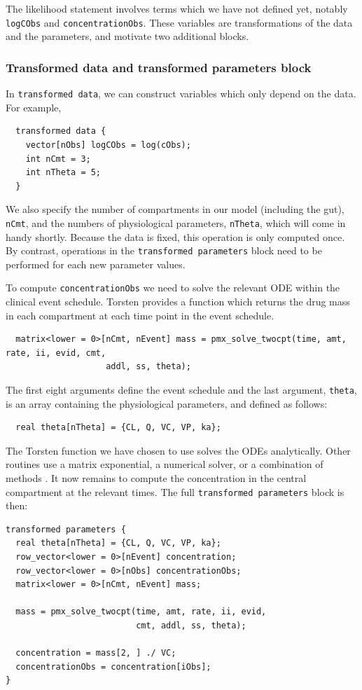 The likelihood statement involves terms which we have not defined yet, notably \texttt{logCObs} and \texttt{concentrationObs}.
These variables are transformations of the data and the parameters,
and motivate two additional blocks.

\subsubsection{Transformed data and transformed parameters block}

In \texttt{transformed data}, we can construct variables which only depend on the data.
For example,
\begin{lstlisting}
  transformed data {
    vector[nObs] logCObs = log(cObs);
    int nCmt = 3;
    int nTheta = 5; 
  }
\end{lstlisting}
We also specify the number of compartments in our model (including the gut), \texttt{nCmt}, and the numbers of physiological parameters, \texttt{nTheta}, which will come in handy shortly.
Because the data is fixed, this operation is only computed once.
By contrast, operations in the \texttt{transformed parameters} block need to be performed for each new parameter values.

To compute \texttt{concentrationObs} we need to solve the relevant ODE within the clinical event schedule.
Torsten provides a function which returns the drug mass in each compartment at each time point in the event schedule.
\begin{lstlisting}
  matrix<lower = 0>[nCmt, nEvent] mass = pmx_solve_twocpt(time, amt, rate, ii, evid, cmt, 
                    addl, ss, theta);
\end{lstlisting}
%
The first eight arguments define the event schedule and the last argument, \texttt{theta}, is an array containing the physiological parameters, and defined as follows:
\begin{lstlisting}
  real theta[nTheta] = {CL, Q, VC, VP, ka};
\end{lstlisting}
%
The Torsten function we have chosen to use solves the ODEs analytically.
Other routines use a matrix exponential, a numerical solver, or a combination of methods \cite{Margossian:2017}.
It now remains to compute the concentration in the central compartment at the relevant times.
The full \texttt{transformed parameters} block is then:
\begin{lstlisting}
transformed parameters {
  real theta[nTheta] = {CL, Q, VC, VP, ka};
  row_vector<lower = 0>[nEvent] concentration;
  row_vector<lower = 0>[nObs] concentrationObs;
  matrix<lower = 0>[nCmt, nEvent] mass;

  mass = pmx_solve_twocpt(time, amt, rate, ii, evid, 
                          cmt, addl, ss, theta);

  concentration = mass[2, ] ./ VC;
  concentrationObs = concentration[iObs];
}  
\end{lstlisting} 

